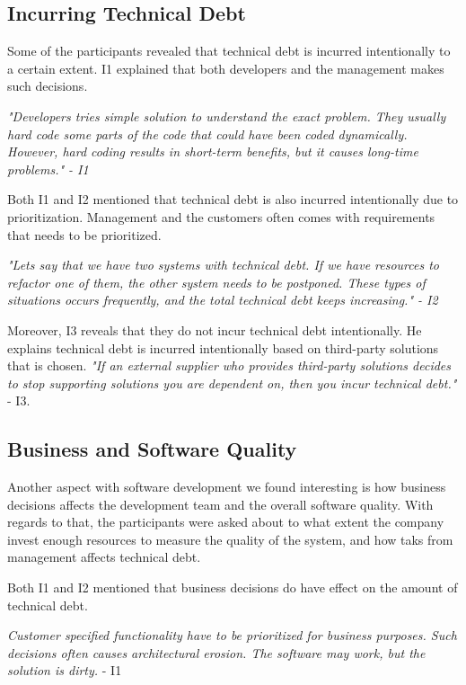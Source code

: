\subsection{Incurring Technical Debt}
Some of the participants revealed that technical debt is incurred intentionally to a certain extent. I1 explained that both developers and the management makes such decisions. 

\begin{displayquote}
	\textit{"Developers tries simple solution to understand the exact problem. They usually hard code some parts of the code that could have been coded dynamically. However, hard coding results in short-term benefits, but it causes long-time problems." - I1}
\end{displayquote}

Both I1 and I2 mentioned that technical debt is also incurred intentionally due to prioritization. Management and the customers often comes with requirements that needs to be prioritized. 

\begin{displayquote}
	\textit{"Lets say that we have two systems with technical debt. If we have resources to refactor one of them, the other system needs to be postponed. These types of situations occurs frequently, and the total technical debt keeps increasing." - I2}
\end{displayquote}

Moreover, I3 reveals that they do not incur technical debt intentionally. He explains technical debt is incurred intentionally based on third-party solutions that is chosen. \textit{"If an external supplier who provides third-party solutions decides to stop supporting solutions you are dependent on, then you incur technical debt."} - I3. 



\subsection{Business and Software Quality}
Another aspect with software development we found interesting is how business decisions affects the development team and the overall software quality. With regards to that, the participants were asked about to what extent the company invest enough resources to measure the quality of the system, and how taks from management affects technical debt.

Both I1 and I2 mentioned that business decisions do have effect on the amount of technical debt. 
\begin{displayquote}
\textit{Customer specified functionality have to be prioritized for business purposes. Such decisions often causes architectural erosion. The software may work, but the solution is dirty.} - I1
\end{displayquote}

